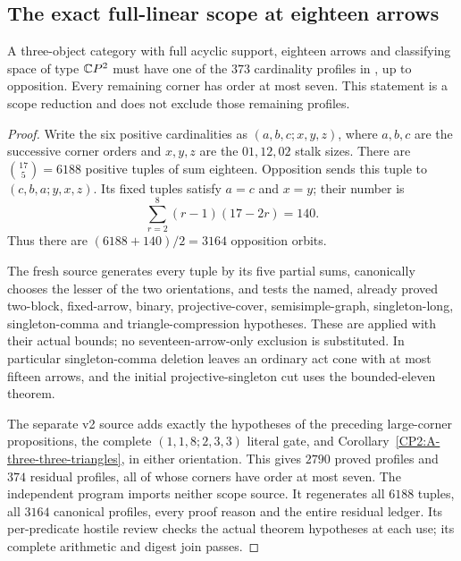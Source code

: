 \subsection{The exact full-linear scope at eighteen arrows}

\begin{proposition}
\label{CP2:A-linear-eighteen-scope}
A three-object category with full acyclic support, eighteen
arrows and classifying space of type $\mathbb{C}P^2$ must have one
of the $373$ cardinality profiles in
,
up to opposition. Every remaining corner has order at
most seven. This statement is a scope reduction and does
not exclude those remaining profiles.
\end{proposition}
\begin{proof}
Write the six positive cardinalities as
$(a,b,c;x,y,z)$, where $a,b,c$ are the successive corner
orders and $x,y,z$ are the $01,12,02$ stalk sizes.
There are $\binom{17}{5}=6188$ positive tuples of sum
eighteen. Opposition sends this tuple to
$(c,b,a;y,x,z)$. Its fixed tuples satisfy $a=c$ and
$x=y$; their number is
\[
 \sum_{r=2}^{8}(r-1)(17-2r)=140.
\]
Thus there are $(6188+140)/2=3164$ opposition orbits.

The fresh source 
generates every tuple by its five partial sums, canonically
chooses the lesser of the two orientations, and tests the
named, already proved two-block, fixed-arrow, binary,
projective-cover, semisimple-graph, singleton-long,
singleton-comma and triangle-compression hypotheses.
These are applied with their actual bounds; no
seventeen-arrow-only exclusion is substituted. In
particular singleton-comma deletion leaves an ordinary
act cone with at most fifteen arrows, and the initial
projective-singleton cut uses the bounded-eleven theorem.

The separate v2 source adds exactly the hypotheses of
the preceding large-corner propositions, the complete
$(1,1,8;2,3,3)$ literal gate, and
Corollary~\ref{CP2:A-three-three-triangles}, in either
orientation. This gives $2790$ proved profiles and
$374$ residual profiles, all of whose corners have
order at most seven. The independent program
imports neither scope source. It regenerates all $6188$
tuples, all $3164$ canonical profiles, every proof reason
and the entire residual ledger. Its per-predicate hostile
review checks the actual theorem hypotheses at each use;
its complete arithmetic and digest join passes.


\end{proof}

